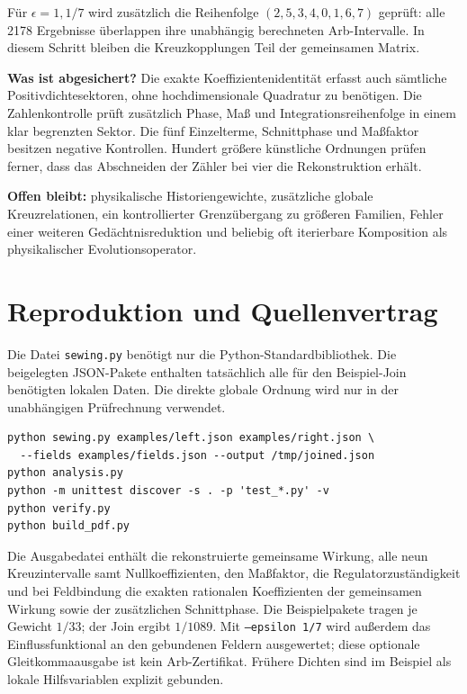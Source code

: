 \documentclass[10pt,a4paper]{article}
\begin{document}
Für $\epsilon=1,1/7$ wird zusätzlich die Reihenfolge
$(2,5,3,4,0,1,6,7)$ geprüft: alle 2178 Ergebnisse überlappen ihre
unabhängig berechneten Arb-Intervalle. In diesem Schritt bleiben
die Kreuzkopplungen Teil der gemeinsamen Matrix.

\textbf{Was ist abgesichert?}
Die exakte Koeffizientenidentität erfasst auch sämtliche Positivdichtesektoren,
ohne hochdimensionale Quadratur zu benötigen. Die Zahlenkontrolle prüft
zusätzlich Phase, Maß und Integrationsreihenfolge in einem klar begrenzten
Sektor. Die fünf Einzelterme, Schnittphase und Maßfaktor besitzen
negative Kontrollen. Hundert größere künstliche Ordnungen prüfen ferner,
dass das Abschneiden der Zähler bei vier die Rekonstruktion erhält.

\textbf{Offen bleibt:} physikalische Historiengewichte, zusätzliche globale
Kreuzrelationen, ein kontrollierter Grenzübergang zu größeren Familien,
Fehler einer weiteren Gedächtnisreduktion und beliebig oft iterierbare
Komposition als physikalischer Evolutionsoperator.
\newpage

\section{Reproduktion und Quellenvertrag}
Die Datei \texttt{sewing.py} benötigt nur die Python-Standardbibliothek.
Die beigelegten JSON-Pakete enthalten tatsächlich alle für den Beispiel-Join
benötigten lokalen Daten. Die direkte globale Ordnung wird nur in der
unabhängigen Prüfrechnung verwendet.

\begin{verbatim}
python sewing.py examples/left.json examples/right.json \
  --fields examples/fields.json --output /tmp/joined.json
python analysis.py
python -m unittest discover -s . -p 'test_*.py' -v
python verify.py
python build_pdf.py
\end{verbatim}
Die Ausgabedatei enthält die rekonstruierte gemeinsame Wirkung,
alle neun Kreuzintervalle samt Nullkoeffizienten, den Maßfaktor,
die Regulatorzuständigkeit und bei Feldbindung die exakten rationalen
Koeffizienten der gemeinsamen Wirkung sowie der zusätzlichen Schnittphase.
Die Beispielpakete tragen je Gewicht $1/33$; der Join ergibt $1/1089$.
Mit \texttt{--epsilon 1/7} wird außerdem das Einflussfunktional an den
gebundenen Feldern ausgewertet; diese optionale Gleitkommaausgabe ist
kein Arb-Zertifikat. Frühere Dichten sind im Beispiel als lokale
Hilfsvariablen explizit gebunden.
\end{document}
